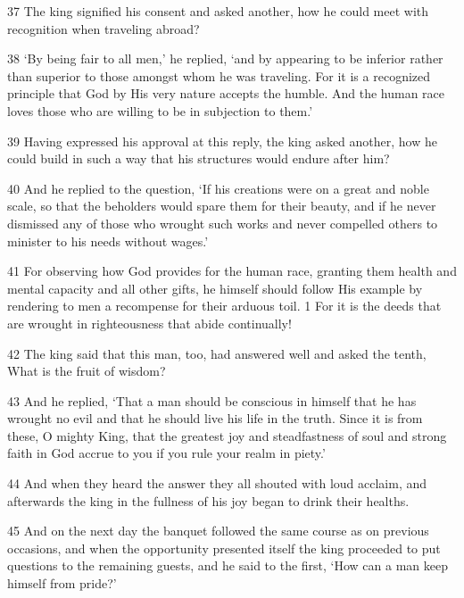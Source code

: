 \par 37 The king signified his consent and asked another, how he could meet with recognition when traveling abroad?

\par 38 ‘By being fair to all men,’ he replied, ‘and by appearing to be inferior rather than superior to those amongst whom he was traveling. For it is a recognized principle that God by His very nature accepts the humble. And the human race loves those who are willing to be in subjection to them.’

\par 39 Having expressed his approval at this reply, the king asked another, how he could build in such a way that his structures would endure after him?

\par 40 And he replied to the question, ‘If his creations were on a great and noble scale, so that the beholders would spare them for their beauty, and if he never dismissed any of those who wrought such works and never compelled others to minister to his needs without wages.’

\par 41 For observing how God provides for the human race, granting them health and mental capacity and all other gifts, he himself should follow His example by rendering to men a recompense for their arduous toil. 1 For it is the deeds that are wrought in righteousness that abide continually!

\par 42 The king said that this man, too, had answered well and asked the tenth, What is the fruit of wisdom?

\par 43 And he replied, ‘That a man should be conscious in himself that he has wrought no evil and that he should live his life in the truth. Since it is from these, O mighty King, that the greatest joy and steadfastness of soul and strong faith in God accrue to you if you rule your realm in piety.’

\par 44 And when they heard the answer they all shouted with loud acclaim, and afterwards the king in the fullness of his joy began to drink their healths.

\par 45 And on the next day the banquet followed the same course as on previous occasions, and when the opportunity presented itself the king proceeded to put questions to the remaining guests, and he said to the first, ‘How can a man keep himself from pride?’

